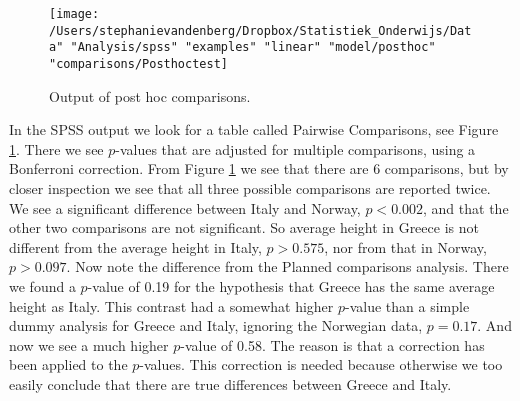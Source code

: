 \begin{figure}[h]
    \begin{center}
       \texttt{[image: /Users/stephanievandenberg/Dropbox/Statistiek\_Onderwijs/Data" "Analysis/spss" "examples" "linear" "model/posthoc" "comparisons/Posthoctest]}
    \end{center}
    \caption{Output of post hoc comparisons.}
        \label{fig:posthoctest}
\end{figure}

In the SPSS output we look for a table called Pairwise Comparisons, see Figure \ref{fig:posthoctest}. There we see $p$-values that are adjusted for multiple comparisons, using a Bonferroni correction. From Figure \ref{fig:posthoctest} we see that there are 6 comparisons, but by closer inspection we see that all three possible comparisons are reported twice. We see a significant difference between Italy and Norway, $p<0.002$, and that the other two comparisons are not significant. So average height in Greece is not different from the average height in Italy, $p>0.575$, nor from that in Norway, $p>0.097$.
Now note the difference from the Planned comparisons analysis. There we found a $p$-value of 0.19 for the hypothesis that Greece has the same average height as Italy. This contrast had a somewhat higher $p$-value than a simple dummy analysis for Greece and Italy, ignoring the Norwegian data, $p=0.17$. And now we see a much higher $p$-value of 0.58. The reason is that a correction has been applied to the $p$-values. This correction is needed because otherwise we too easily conclude that there are true differences between Greece and Italy.

